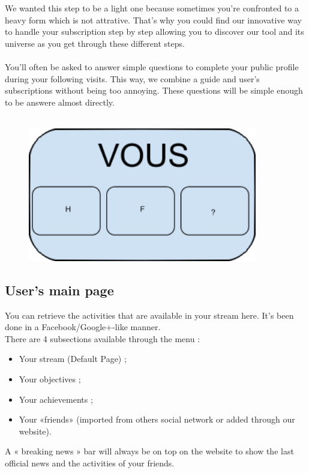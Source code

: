 \documentclass{life-en}
\begin{document}
We wanted this step to be a light one because sometimes you're confronted to a heavy form which is not attrative.
That's why you could find our innovative way to handle your subscription step by step allowing you to discover our tool and its universe as you get through these different steps.\\
\\
You'll often be asked to answer simple questions to complete your public profile during your following visits. This way, we combine a guide and user's subscriptions without being too annoying. These questions will be simple enough to be answere almost directly.\\
\\
\begin{figure}[H]
	\begin{center}
		\includegraphics[width=10cm]{img/vous.png}
	\end{center}
\end{figure}

\subsection{User's main page}

You can retrieve the activities that are available in your stream here. It's been done in a Facebook/Google+-like manner.\\

There are 4 subsections available through the menu :
\begin{itemize}
	\item Your stream (Default Page) ;
	\item Your objectives ;
	\item Your achievements ;
	\item Your «friends» (imported from others social network or added through our website).
\end{itemize}

A « breaking news » bar will always be on top on the website to show the last official news and the activities of your friends.
\end{document}
